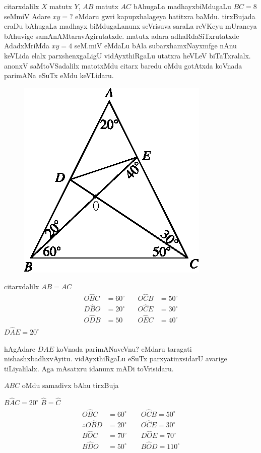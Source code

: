 citarxdalilx $X$ matutx $Y$, $AB$ matutx $AC$ bAhugaLa madhayxbiMdugaLu $BC=8$ seMmiV Adare $xy=?$ eMdaru gwri kapupxhalageya hatitxra baMdu. tirxBujada eraDu bAhugaLa madhayx biMdugaLanunx seVrisuva saraLa reVKeyu mUraneya bAhuvige samAnAMtaravAgirutatxde. matutx adara adhaRdaSiTxrutatxde AdadxMriMda $xy=4$ seM.miV eMdaLu bAla subarxhamxNayxmfge nAnu keVLida elalx parxshenxgaLigU vidAyxthiRgaLu utatxra heVLeV biTaTxralalx. anonxV saMtoVSadalilx matotxMdu citarx baredu oMdu gotAtxda koVnada parimANa eSuTx eMdu keVLidaru.
\begin{figure}[H]
\centering
\includegraphics{src/figures/m_181.eps}
\end{figure}

\begin{center} 
citarxdalilx $AB=AC$
$$
\begin{matrix}
O\hat{B}C &=60^\circ & \quad  O\hat{C}B &=50^\circ\\
D\hat{B}O &=20^\circ & \quad O\hat{C}E &=30^\circ\\
O\hat{D}B &=50 & \quad O\hat{E}C & =40^\circ\\
\end{matrix}
$$
$D\hat{A}E =20^\circ$
\end{center}

hAgAdare $DAE$ koVnada parimANaveVnu? eMdaru taragati nishashxbadhxvAyitu. vidAyxthiRgaLu eSuTx parxyatinxsidarU avarige tiLiyalilalx. Aga mAsatxru idanunx mADi toVrisidaru.

$ABC$ \quad oMdu samadivx bAhu tirxBuja

$B\hat{A}C=20^\circ$ \qquad $\hat{B}=\hat{C}$
\begin{align*}
O\hat{B}C &=60^\circ  \qquad O\hat{C}B =50^\circ\\
\therefore O\hat{B}D  &=20^\circ  \qquad O\hat{C}E =30^\circ\\
B\hat{O}C &=70^\circ   \qquad D\hat{O}E =70^\circ\\
B\hat{D}O &=50^\circ   \qquad B\hat{O}D =110^\circ
\end{align*}

